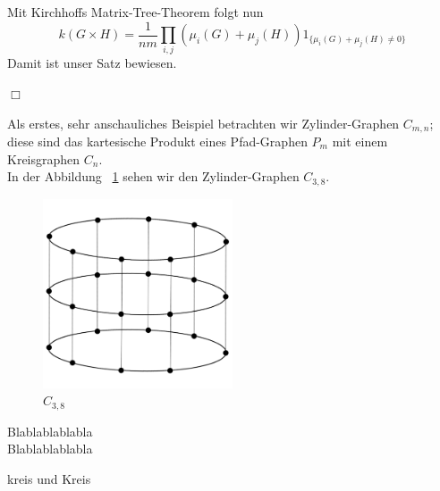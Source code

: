 Mit Kirchhoffs Matrix-Tree-Theorem folgt nun
\begin{equation}
 \mathit{k}(G \times H) = \frac{1}{nm}\displaystyle\prod_{i,j}(\mu_i(G)+\mu_j(H))1_{\{\mu_i(G)+\mu_j(H)\neq0\}}
\end{equation}
Damit ist unser Satz bewiesen.
\begin{flushright} $\Box$ \end{flushright} 
Als erstes, sehr anschauliches Beispiel betrachten wir Zylinder-Graphen $C_{m,n}$;
diese sind das kartesische Produkt eines Pfad-Graphen $P_m$ mit einem Kreisgraphen $C_n$.\\
In der Abbildung ~\ref{c8xp3} sehen wir den Zylinder-Graphen $C_{3,8}$.
\begin{figure}[h]
  \centering
 \includegraphics[width=0.5\textwidth]{c8xp3.png}
 \caption{$C_{3,8}$}
 \label{c8xp3} %
\end{figure}
\begin{Bsps}
Blablablablabla\\
Blablablablabla
\end{Bsps}
\begin{Bsps}
kreis und Kreis
\end{Bsps}
\begin{Bsps}
\end{Bsps}
